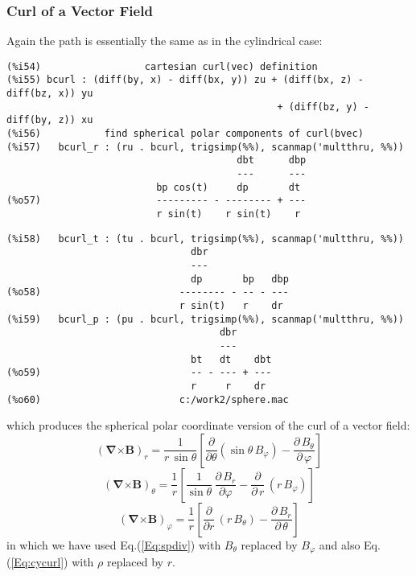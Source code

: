 \documentclass[12pt]{article}
\begin{document}
\subsubsection*{Curl of a Vector Field}
Again the path is essentially the same as in the cylindrical case:
\small
\begin{verbatim}
(%i54)                  cartesian curl(vec) definition  
(%i55) bcurl : (diff(by, x) - diff(bx, y)) zu + (diff(bx, z) - diff(bz, x)) yu
                                               + (diff(bz, y) - diff(by, z)) xu
(%i56)           find spherical polar components of curl(bvec) 
(%i57)   bcurl_r : (ru . bcurl, trigsimp(%%), scanmap('multthru, %%))
                                        dbt      dbp
                                        ---      ---
                          bp cos(t)     dp       dt
(%o57)                    --------- - -------- + ---
                          r sin(t)    r sin(t)    r
\end{verbatim}
\newpage
\begin{verbatim}
(%i58)   bcurl_t : (tu . bcurl, trigsimp(%%), scanmap('multthru, %%))
                                dbr
                                ---
                                dp       bp   dbp
(%o58)                        -------- - -- - ---
                              r sin(t)   r    dr
(%i59)   bcurl_p : (pu . bcurl, trigsimp(%%), scanmap('multthru, %%))
                                     dbr
                                     ---
                                bt   dt    dbt
(%o59)                          -- - --- + ---
                                r     r    dr
(%o60)                        c:/work2/sphere.mac
\end{verbatim}
\normalsize
which produces the spherical polar coordinate version of the curl of a vector field:
\begin{equation}
\left( \boldsymbol{\nabla} \boldsymbol{\times}  \mathbf{B} \right)_{r} =
  \frac{1}{r \, \sin \theta} \left[ \frac{\partial }{\partial \theta} \left( \sin \theta\,B_{\varphi} \right)-
    \frac{\partial \,B_{\theta}}{\partial \,\varphi} \right]
\end{equation}
\begin{equation}
\left( \boldsymbol{\nabla} \boldsymbol{\times}  \mathbf{B} \right)_{\theta} =
  \frac{1}{r} \left[ \frac{1}{\sin \theta} \,\frac{\partial \,B_{r} }{\partial \varphi}   -
    \frac{\partial }{\partial \, r}  \, \left( r\, B_{\varphi} \right) \right]
\end{equation}
\begin{equation}
\left( \boldsymbol{\nabla} \boldsymbol{\times}  \mathbf{B} \right)_{\varphi} =
  \frac{1}{r} \left[ \frac{\partial }{\partial r} \, \left(r\, B_{\theta} \right)   -
    \frac{\partial \, B_{r} }{\partial \, \theta}   \right]
\end{equation}
in which we have used Eq.(\ref{Eq:spdiv}) with $B_{\theta}$ replaced by $B_{\varphi}$
and also Eq.(\ref{Eq:cycurl}) with $\rho$ replaced by $r$.
\end{document}
